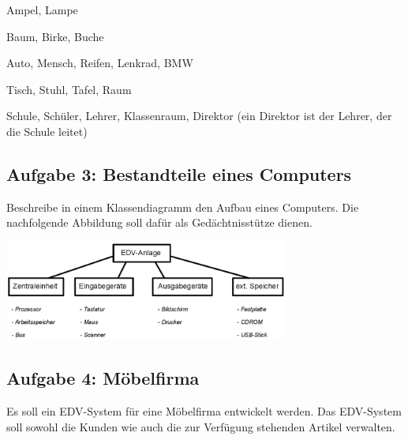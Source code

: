 \begin{compactenum}[a)]
\item Ampel, Lampe
\item Baum, Birke, Buche
\item Auto, Mensch, Reifen, Lenkrad, BMW
\item Tisch, Stuhl, Tafel, Raum
\item Schule, Schüler, Lehrer, Klassenraum, Direktor (ein Direktor ist der
Lehrer, der die Schule leitet) 
\end{compactenum}


\subsection{Aufgabe 3: Bestandteile eines Computers}

Beschreibe in einem Klassendiagramm den Aufbau eines Computers. Die
nachfolgende Abbildung soll dafür als Gedächtnisstütze dienen.

\begin{center}
\includegraphics[width=0.7\textwidth]{./inf/SEKII/15_UML_Klassendiagramme/Computer-Komponenten.png}
\end{center}


\subsection{Aufgabe 4: Möbelfirma}

Es soll ein EDV-System für eine Möbelfirma entwickelt werden. Das EDV-System
soll sowohl die Kunden wie auch die zur Verfügung stehenden Artikel verwalten.

